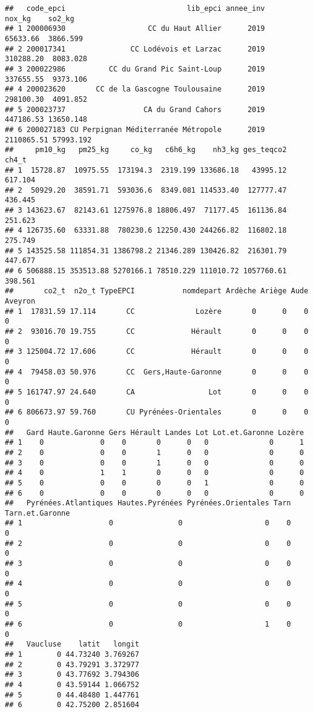 \documentclass[
]{article}
\begin{document}
\begin{verbatim}
##   code_epci                            lib_epci annee_inv     nox_kg    so2_kg
## 1 200006930                   CC du Haut Allier      2019   65633.66  3866.599
## 2 200017341               CC Lodévois et Larzac      2019  310288.20  8083.028
## 3 200022986          CC du Grand Pic Saint-Loup      2019  337655.55  9373.106
## 4 200023620       CC de la Gascogne Toulousaine      2019  298100.30  4091.852
## 5 200023737                  CA du Grand Cahors      2019  447186.53 13650.148
## 6 200027183 CU Perpignan Méditerranée Métropole      2019 2110865.51 57993.192
##     pm10_kg   pm25_kg     co_kg   c6h6_kg    nh3_kg ges_teqco2   ch4_t
## 1  15728.87  10975.55  173194.3  2319.199 133686.18   43995.12 617.104
## 2  50929.20  38591.71  593036.6  8349.081 114533.40  127777.47 436.445
## 3 143623.67  82143.61 1275976.8 18806.497  71177.45  161136.84 251.623
## 4 126735.60  63331.88  780230.6 12250.430 244266.82  116802.18 275.749
## 5 143525.58 111854.31 1386798.2 21346.289 130426.82  216301.79 447.677
## 6 506888.15 353513.88 5270166.1 78510.229 111010.72 1057760.61 398.561
##       co2_t  n2o_t TypeEPCI           nomdepart Ardèche Ariège Aude Aveyron
## 1  17831.59 17.114       CC              Lozère       0      0    0       0
## 2  93016.70 19.755       CC             Hérault       0      0    0       0
## 3 125004.72 17.606       CC             Hérault       0      0    0       0
## 4  79458.03 50.976       CC  Gers,Haute-Garonne       0      0    0       0
## 5 161747.97 24.640       CA                 Lot       0      0    0       0
## 6 806673.97 59.760       CU Pyrénées-Orientales       0      0    0       0
##   Gard Haute.Garonne Gers Hérault Landes Lot Lot.et.Garonne Lozère
## 1    0             0    0       0      0   0              0      1
## 2    0             0    0       1      0   0              0      0
## 3    0             0    0       1      0   0              0      0
## 4    0             1    1       0      0   0              0      0
## 5    0             0    0       0      0   1              0      0
## 6    0             0    0       0      0   0              0      0
##   Pyrénées.Atlantiques Hautes.Pyrénées Pyrénées.Orientales Tarn Tarn.et.Garonne
## 1                    0               0                   0    0               0
## 2                    0               0                   0    0               0
## 3                    0               0                   0    0               0
## 4                    0               0                   0    0               0
## 5                    0               0                   0    0               0
## 6                    0               0                   1    0               0
##   Vaucluse    latit   longit
## 1        0 44.73240 3.769267
## 2        0 43.79291 3.372977
## 3        0 43.77692 3.794306
## 4        0 43.59144 1.066752
## 5        0 44.48480 1.447761
## 6        0 42.75200 2.851604
\end{verbatim}
\end{document}
